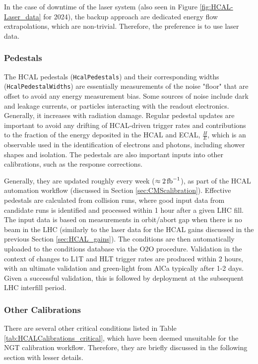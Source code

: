 In the case of downtime of the laser system (also seen in Figure \ref{fig:HCAL-Laser_data} for 2024), the backup approach are dedicated energy flow extrapolations, which are non-trivial. Therefore, the preference is to use laser data.

\subsubsection{Pedestals}\label{sec:HCAL_pedestals}
The HCAL pedestals (\texttt{HcalPedestals}) and their corresponding widths (\texttt{HcalPedestalWidths}) are essentially measurements of the noise "floor" that are offset to avoid any energy measurement bias. Some sources of noise include dark and leakage currents, or particles interacting with the readout electronics. Generally, it increases with radiation damage. Regular pedestal updates are important to avoid any drifting of HCAL-driven trigger rates and contributions to the fraction of the energy deposited in the HCAL and ECAL, $\frac{H}{E}$, which is an observable used in the identification of electrons and photons, including shower shapes and isolation. The pedestals are also important inputs into other calibrations, such as the response corrections.

Generally, they are updated roughly every week ($\approx 2 \mbox{\ensuremath{\,\text{fb}^{-1}}}$), as part of the HCAL automation workflow (discussed in Section \ref{sec:CMScalibration}). Effective pedestals are calculated from collision runs, where good input data from candidate runs is identified and processed within 1 hour after a given LHC fill. The input data is based on measurements in orbit/abort gap when there is no beam in the LHC (similarly to the laser data for the HCAL gains discussed in the previous Section \ref{sec:HCAL_gains}). The conditions are then automatically uploaded to the conditions database via the O2O procedure. Validation in the context of changes to L1T and HLT trigger rates are produced within 2 hours, with an ultimate validation and green-light from AlCa typically after 1-2 days. Given a successful validation, this is followed by deployment at the subsequent LHC interfill period.

\subsubsection{Other Calibrations}
There are several other critical conditions listed in Table \ref{tab:HCALCalibrations_critical}, which have been deemed unsuitable for the NGT calibration workflow. Therefore, they are briefly discussed in the following section with lesser details.

